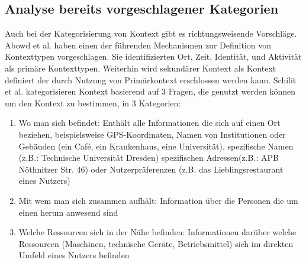 \subsection{ Analyse bereits vorgeschlagener Kategorien} 
Auch bei der Kategorisierung von Kontext gibt es richtungsweisende Vorschläge.
Abowd et al.\cite{abowd_towards_1999} haben einen der führenden Mechanismen zur Definition von Kontexttypen vorgeschlagen. Sie identifizierten Ort, Zeit, Identität, und Aktivität als primäre Kontexttypen. Weiterhin wird sekundärer Kontext als Kontext definiert der durch Nutzung von Primärkontext erschlossen werden kann.
Schilit et al. \cite{schilit_context-aware_1994} kategorisieren Kontext basierend auf 3 Fragen, die genutzt werden können um den Kontext zu bestimmen, in 3 Kategorien:
\begin{enumerate}
\item{Wo man sich befindet: Enthält alle Informationen die sich auf einen Ort beziehen, beispielsweise GPS-Koordinaten, Namen von Institutionen oder Gebäuden (ein Café, ein Krankenhaus, eine Universität), spezifische Namen (z.B.: Technische Universität Dresden) spezifischen Adressen(z.B.: APB Nöthnitzer Str. 46) oder Nutzerpräferenzen (z.B. das Lieblingsrestaurant eines Nutzers) }
\item{Mit wem man sich zusammen aufhält: Information über die Personen die um einen herum anwesend sind}
\item{Welche Ressourcen sich in der Nähe befinden: Informationen darüber welche Ressourcen (Maschinen, technische Geräte, Betriebsmittel) sich im direkten Umfeld eines Nutzers befinden}
\end{enumerate}
